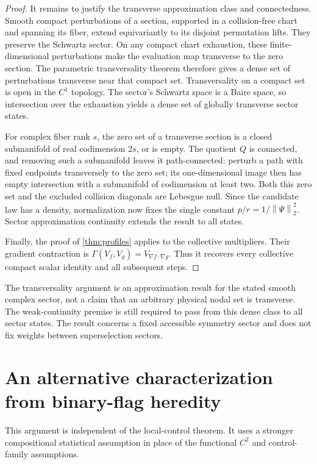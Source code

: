\documentclass[11pt]{article}
\numberwithin{equation}{section}
\theoremstyle{definition}
\newcommand{\norm}[1]{\left\|#1\right\|}
\begin{document}
\begin{proof}
It remains to justify the transverse approximation class and connectedness. Smooth compact perturbations of a section, supported in a collision-free chart and spanning its fiber, extend equivariantly to its disjoint permutation lifts. They preserve the Schwartz sector. On any compact chart exhaustion, these finite-dimensional perturbations make the evaluation map transverse to the zero section. The parametric transversality theorem \cite[Chapter 3]{Hirsch1976} therefore gives a dense set of perturbations transverse near that compact set. Transversality on a compact set is open in the \(C^1\) topology. The sector's Schwartz space is a Baire space, so intersection over the exhaustion yields a dense set of globally transverse sector states.

For complex fiber rank \(s\), the zero set of a transverse section is a closed submanifold of real codimension \(2s\), or is empty. The quotient \(Q\) is connected, and removing such a submanifold leaves it path-connected: perturb a path with fixed endpoints transversely to the zero set; its one-dimensional image then has empty intersection with a submanifold of codimension at least two. Both this zero set and the excluded collision diagonals are Lebesgue null. Since the candidate law has a density, normalization now fixes the single constant \(p/r=1/\norm{\Psi}_2^2\). Sector approximation continuity extends the result to all states.

Finally, the proof of \cref{thm:profiles} applies to the collective multipliers. Their gradient contraction is
\(\Gamma(V_f,V_g)=V_{\nabla f\cdot\nabla g}\).
Thus it recovers every collective compact scalar identity and all subsequent steps.
\end{proof}

The transversality argument is an approximation result for the stated smooth complex sector, not a claim that an arbitrary physical nodal set is transverse. The weak-continuity premise is still required to pass from this dense class to all sector states. The result concerns a fixed accessible symmetry sector and does not fix weights between superselection sectors.

\section{An alternative characterization from binary-flag heredity}\label{app:heredity}

This argument is independent of the local-control theorem. It uses a stronger compositional statistical assumption in place of the functional \(C^2\) and control-family assumptions.
\end{document}

